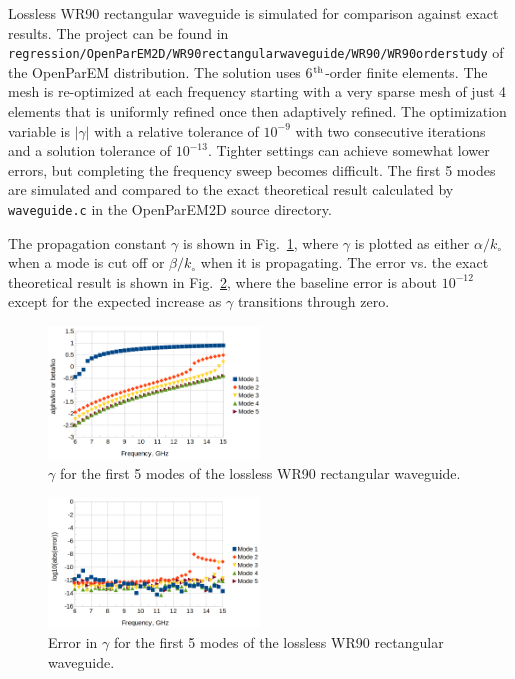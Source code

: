 \documentclass[titlepage]{article}
\renewcommand\_{\textunderscore\linebreak[1]}
\begin{document}
Lossless WR90 rectangular waveguide is simulated for comparison against exact results.  The project can be found in \texttt{regression/OpenParEM2D/WR90\_rectangular\_waveguide/WR90/WR90\_order\_6\_study} of the OpenParEM distribution. The solution uses 6$^{\textnormal{th}}$-order finite elements.  The mesh is re-optimized at each frequency starting with a very sparse mesh of just 4 elements that is uniformly refined once then adaptively refined. The optimization variable is $|\gamma|$ with a relative tolerance of $10^{-9}$ with two consecutive iterations and a solution tolerance of $10^{-13}$.  Tighter settings can achieve somewhat lower errors, but completing the frequency sweep becomes difficult.  The first 5 modes are simulated and compared to the exact theoretical result calculated by \texttt{waveguide.c} in the OpenParEM2D source directory.

The propagation constant $\gamma$ is shown in Fig.~\ref{fig:WR90_gamma}, where $\gamma$ is plotted as either $\alpha/k_{\circ}$ when a mode is cut off or $\beta/k_{\circ}$ when it is propagating.  The error vs. the exact theoretical result is shown in Fig.~\ref{fig:WR90_gamma_error}, where the baseline error is about $10^{-12}$ except for the expected increase as $\gamma$ transitions through zero.

\begin{figure}[H]
  \centering
  \includegraphics[width=0.5\textwidth]{../regression/OpenParEM2D/WR90_rectangular_waveguide/WR90/WR90_order_6_study/screenshots/WR90_gamma}
  \caption{$\gamma$ for the first 5 modes of the lossless WR90 rectangular waveguide.}
  \label{fig:WR90_gamma}
\end{figure}

\begin{figure}[H]
  \centering
  \includegraphics[width=0.5\textwidth]{../regression/OpenParEM2D/WR90_rectangular_waveguide/WR90/WR90_order_6_study/screenshots/WR90_gamma_error}
  \caption{Error in $\gamma$ for the first 5 modes of the lossless WR90 rectangular waveguide.}
  \label{fig:WR90_gamma_error}
\end{figure}
\end{document}

